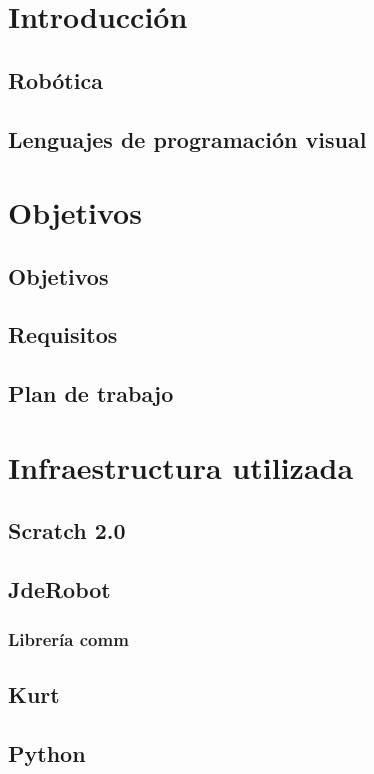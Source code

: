 \documentclass{article}
\begin{document}
 
\tableofcontents
 
\vspace{2cm}
 
\section{Introducción}
    \subsection{Robótica}
    \subsection{Lenguajes de programación visual}
\section{Objetivos}
    \subsection{Objetivos}
    \subsection{Requisitos}
    \subsection{Plan de trabajo}
\section{Infraestructura utilizada}
    \subsection{Scratch 2.0}
    \subsection{JdeRobot}
        \subsubsection{Librería comm}
    \subsection{Kurt}
    \subsection{Python}
\end{document}
